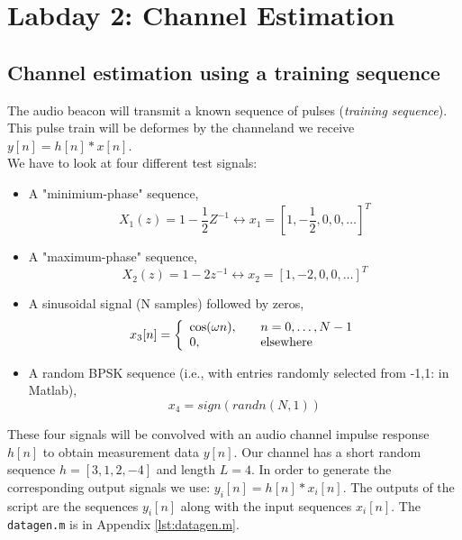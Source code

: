 \documentclass[final]{scrreprt} %
\begin{document}
\chapter{Labday 2: Channel Estimation}
\label{ch:labday2}

\section{Channel estimation using a training sequence}

The audio beacon will transmit a known sequence of pulses (\textit{training sequence}).
This pulse train will be deformes by the channeland we receive $y[n]=h[n]*x[n]$.\\


We have to look at four different test signals:

\begin{itemize}
\item 	A "minimium-phase" sequence, 
\begin{equation}
X_1(z) = 1 - \dfrac{1}{2}Z^{-1} \leftrightarrow x_1 = [1, -\dfrac{1}{2}, 0, 0,  \dots]^T
\end{equation}
\item A "maximum-phase" sequence,
\begin{equation}
X_2(z) = 1 - 2z^{-1} \leftrightarrow x_2 = [1, -2, 0, 0, \dots]^T
\end{equation}
\item A sinusoidal signal (N samples) followed by zeros,
\[ x_3[n] = \left\{ 
  \begin{array}{l l}
    \cos(\omega n), & \quad n = 0, \dots ,N - 1\\
    0, & \quad \textrm{elsewhere}
  \end{array} \right.\]
\item A random BPSK sequence (i.e., with entries randomly selected from {-1,1}: in Matlab),
\begin{equation}
x_4 = sign(randn(N,1))
\end{equation}
\end{itemize}

These four signals will be convolved with an audio channel impulse response $h[n]$ to obtain measurement data $y[n]$.
Our channel has a short random sequence $h = [3, 1, 2, -4]$ and length $L = 4$.
In order to generate the corresponding output signals we use: $y_{i}[n]=h[n]*x_{i}[n]$.
The outputs of the script are the sequences $y_{i}[n]$ along with the input sequences $x_{i}[n]$. 
The \texttt{datagen.m} is in Appendix \ref{lst:datagen.m}. 
\\
\\
\end{document}
